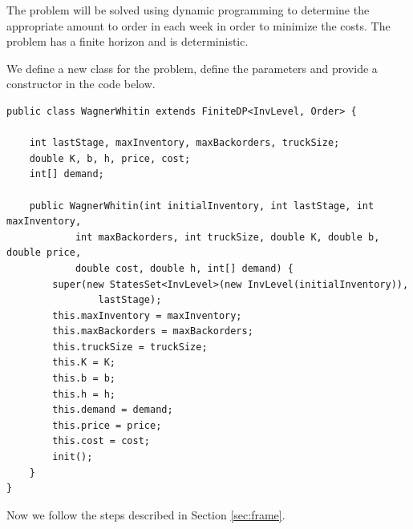 \documentclass[11pt]{article}
\begin{document}
The problem will be solved using dynamic programming to determine the appropriate amount to order in each week in order to minimize the costs. The problem has a finite horizon and is deterministic.

We define a new class for the problem, define the parameters and provide a constructor in the code below. 
\begin{lstlisting}
public class WagnerWhitin extends FiniteDP<InvLevel, Order> {

    int lastStage, maxInventory, maxBackorders, truckSize;
    double K, b, h, price, cost;
    int[] demand;

    public WagnerWhitin(int initialInventory, int lastStage, int maxInventory,
            int maxBackorders, int truckSize, double K, double b, double price,
            double cost, double h, int[] demand) {
        super(new StatesSet<InvLevel>(new InvLevel(initialInventory)),
                lastStage);
        this.maxInventory = maxInventory;
        this.maxBackorders = maxBackorders;
        this.truckSize = truckSize;
        this.K = K;
        this.b = b;
        this.h = h;
        this.demand = demand;
        this.price = price;
        this.cost = cost;
        init();
    }
}
\end{lstlisting}
Now we follow the steps described in Section \ref{sec:frame}.
\end{document}
